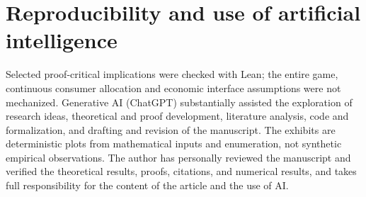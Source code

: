 \documentclass[11pt]{article}
\begin{document}
\section*{Reproducibility and use of artificial intelligence}
Selected proof-critical implications were checked with Lean; the entire game, continuous consumer allocation and economic interface assumptions were not mechanized. Generative AI (ChatGPT) substantially assisted the exploration of research ideas, theoretical and proof development, literature analysis, code and formalization, and drafting and revision of the manuscript. The exhibits are deterministic plots from mathematical inputs and enumeration, not synthetic empirical observations. The author has personally reviewed the manuscript and verified the theoretical results, proofs, citations, and numerical results, and takes full responsibility for the content of the article and the use of AI.
\setlength{\bibsep}{0pt}


\end{document}
